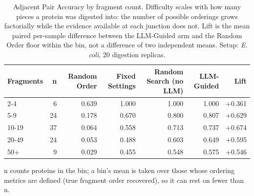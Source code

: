 \begin{table}[!tb]
  \centering
  \caption{Adjacent Pair Accuracy by fragment count. Difficulty scales with how many pieces a protein was digested into: the number of possible orderings grows factorially while the evidence available at each junction does not. Lift is the mean paired per-sample difference between the LLM-Guided arm and the Random Order floor within the bin, not a difference of two independent means. Setup: \textnormal{\textnormal{\textit{E. coli}}}, 20 digestion replicas.}
  \label{tab:stratification_ecoli_r20}
  \begin{tabular}{lrrrrrr}
    \toprule
    Fragments & n & Random Order & Fixed Settings & Random Search (no LLM) & LLM-Guided & Lift \\
    \midrule
    2-4 & 6 & 0.639 & 1.000 & 1.000 & 1.000 & +0.361 \\
    5-9 & 24 & 0.178 & 0.670 & 0.800 & 0.807 & +0.629 \\
    10-19 & 37 & 0.064 & 0.558 & 0.713 & 0.737 & +0.674 \\
    20-49 & 24 & 0.053 & 0.488 & 0.603 & 0.649 & +0.595 \\
    50+ & 9 & 0.029 & 0.455 & 0.548 & 0.575 & +0.546 \\
    \bottomrule
  \end{tabular}
  \par\smallskip\footnotesize{n counts proteins in the bin; a bin's mean is taken over those whose ordering metrics are defined (true fragment order recovered), so it can rest on fewer than n.}
\end{table}
